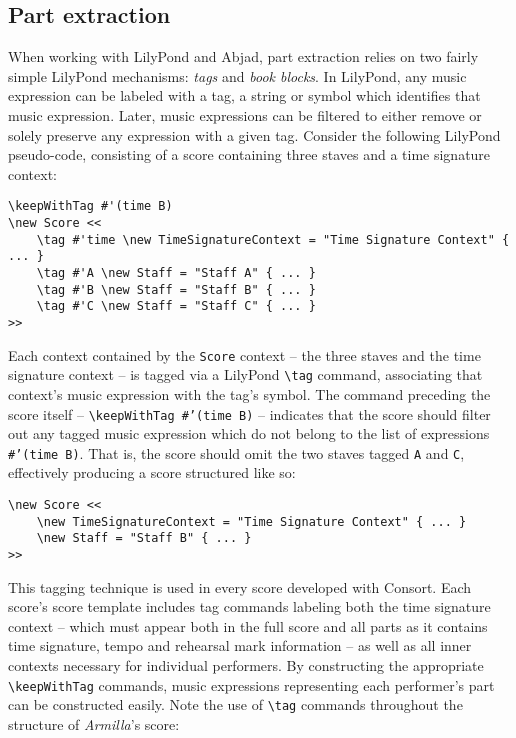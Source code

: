 \subsection{Part extraction}
\label{ssec:part-extraction}

When working with LilyPond and Abjad, part extraction relies on two fairly
simple LilyPond mechanisms: \emph{tags} and \emph{book blocks}. In LilyPond,
any music expression can be labeled with a tag, a string or symbol which
identifies that music expression. Later, music expressions can be filtered to
either remove or solely preserve any expression with a given tag. Consider the
following LilyPond pseudo-code, consisting of a score containing three staves
and a time signature context:

\begin{singlespacing}
\vspace{-0.5\baselineskip}
\begin{verbatim}
\keepWithTag #'(time B)
\new Score <<
    \tag #'time \new TimeSignatureContext = "Time Signature Context" { ... }
    \tag #'A \new Staff = "Staff A" { ... }
    \tag #'B \new Staff = "Staff B" { ... }
    \tag #'C \new Staff = "Staff C" { ... }
>>
\end{verbatim}
\end{singlespacing}

\noindent Each context contained by the \texttt{Score} context -- the three
staves and the time signature context -- is tagged via a LilyPond
\texttt{\textbackslash{}tag} command, associating that context's music
expression with the tag's symbol. The command preceding the score itself --
\texttt{\textbackslash{}keepWithTag \#'(time B)} -- indicates that the score
should filter out any tagged music expression which do not belong to the list
of expressions \texttt{\#'(time B)}. That is, the score should omit the two
staves tagged \texttt{A} and \texttt{C}, effectively producing a score
structured like so:

\begin{singlespacing}
\vspace{-0.5\baselineskip}
\begin{verbatim}
\new Score <<
    \new TimeSignatureContext = "Time Signature Context" { ... }
    \new Staff = "Staff B" { ... }
>>
\end{verbatim}
\end{singlespacing}

\noindent This tagging technique is used in every score developed with Consort.
Each score's score template includes tag commands labeling both the time
signature context -- which must appear both in the full score and all parts as
it contains time signature, tempo and rehearsal mark information -- as well as
all inner contexts necessary for individual performers. By constructing the
appropriate \texttt{\textbackslash{}keepWithTag} commands, music expressions
representing each performer's part can be constructed easily.
Note the use of \texttt{\textbackslash{}tag} commands throughout the structure
of \emph{Armilla}'s score:

